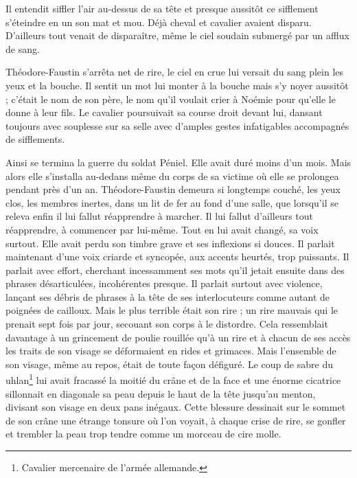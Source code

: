 	{
	
	\bigskip
	
Il entendit siffler l’air au-dessus de sa tête et presque aussitôt ce sifflement s’éteindre en un son mat et mou. Déjà cheval et cavalier avaient disparu. D’ailleurs tout venait de disparaître, même le ciel soudain submergé par un afflux de sang.

Théodore-Faustin s’arrêta net de rire, le ciel en crue lui versait du sang plein les yeux et la bouche. Il sentit un mot lui monter à la bouche mais s’y noyer aussitôt ; c’était le nom de son père, le nom qu’il voulait crier à Noémie pour qu’elle le donne à leur fils. Le cavalier poursuivait sa course droit devant lui, dansant toujours avec souplesse sur sa selle avec d’amples gestes infatigables accompagnés de sifflements.

Ainsi se termina la guerre du soldat Péniel. Elle avait duré moins d’un mois. Mais alors elle s’installa au-dedans même du corps de sa victime où elle se prolongea pendant près d’un an. Théodore-Faustin demeura si longtemps couché, les yeux clos, les membres inertes, dans un lit de fer au fond d’une salle, que lorsqu’il se releva enfin il lui fallut réapprendre à marcher. Il lui fallut d’ailleurs tout réapprendre, à commencer par lui-même. Tout en lui avait changé, sa voix surtout. Elle avait perdu son timbre grave et ses inflexions si douces. Il parlait maintenant d’une voix criarde et syncopée, aux accents heurtés, trop puissants. Il parlait avec effort, cherchant incessamment ses mots qu’il jetait ensuite dans des phrases désarticulées, incohérentes presque. Il parlait surtout avec violence, lançant ses débris de phrases à la tête de ses interlocuteurs comme autant de poignées de cailloux. Mais le plus terrible était son rire ; un rire mauvais qui le prenait sept fois par jour, secouant son corps à le distordre. Cela ressemblait davantage à un grincement de poulie rouillée qu’à un rire et à chacun de ses accès les traits de son visage se déformaient en rides et grimaces. Mais l’ensemble de son visage, même au repos, était de toute façon défiguré. Le coup de sabre du uhlan\footnote{Cavalier mercenaire de l’armée allemande.} lui avait fracassé la moitié du crâne et de la face et une énorme cicatrice sillonnait en diagonale sa peau depuis le haut de la tête jusqu’au menton, divisant son visage en deux pans inégaux. Cette blessure dessinait sur le sommet de son crâne une étrange tonsure où l’on voyait, à chaque crise de rire, se gonfler et trembler la peau trop tendre comme un morceau de cire molle.

}
